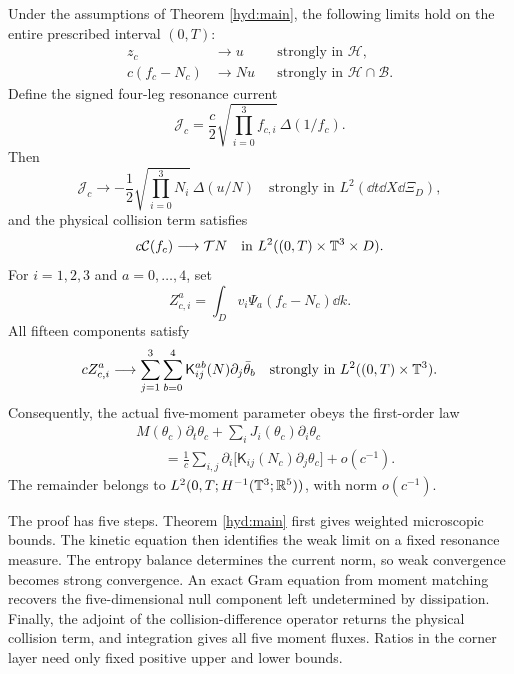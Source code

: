 \begin{theorem}\label{cur:main}
Under the assumptions of Theorem \ref{hyd:main}, the following limits
hold on the entire prescribed interval $(0,T)$:
\begin{align}
 z_c&\longrightarrow u
       &&\text{strongly in }\mathcal H,
       \label{cur:microreciprocal}\\
 c(f_c-N_c)&\longrightarrow Nu
       &&\text{strongly in }\mathcal H\cap\mathcal B.
       \label{cur:microphysical}
\end{align}
Define the signed four-leg resonance current
\[
 \mathcal J_c=\frac c2\sqrt{\prod_{i=0}^3f_{c,i}}\,
                    \Delta(1/f_c).
\]
Then
\begin{equation}\label{cur:resonanceconclusion}
 \mathcal J_c\longrightarrow
 -\frac12\sqrt{\prod_{i=0}^3N_i}\,\Delta(u/N)
 \quad\text{strongly in }L^2(\dd t\dd X\dd\Xi_D),
\end{equation}
and the physical collision term satisfies
\begin{equation}\label{cur:collisionconclusion}
 c\mathcal C(f_c)\longrightarrow\mathcal TN
       \quad\text{in }L^2((0,T)\times\mathbb T^3\times D).
\end{equation}
For $i=1,2,3$ and $a=0,\ldots,4$, set
\[
 Z_{c,i}^a=\int_Dv_i\Psi_a(f_c-N_c)\dd k.
\]
All fifteen components satisfy
\begin{equation}\label{cur:fluxconclusion}
 cZ_{c,i}^a\longrightarrow
       \sum_{j=1}^3\sum_{b=0}^4
          \mathsf K_{ij}^{ab}(N)\partial_j\bar\theta_b
       \quad\text{strongly in }L^2((0,T)\times\mathbb T^3).
\end{equation}
Consequently, the actual five-moment parameter obeys the first-order law
\begin{equation}\label{cur:firstorder}
 \begin{split}
 &M(\theta_c)\partial_t\theta_c
       +\sum_iJ_i(\theta_c)\partial_i\theta_c
 \\
 &\qquad=\frac1c\sum_{i,j}\partial_i
       \bigl[\mathsf K_{ij}(N_c)\partial_j\theta_c\bigr]
       +o(c^{-1}).
 \end{split}
\end{equation}
The remainder belongs to $L^2(0,T;H^{-1}(\mathbb T^3;\mathbb R^5))$, with norm
$o(c^{-1})$.
\end{theorem}

The proof has five steps. Theorem \ref{hyd:main} first gives weighted
microscopic bounds. The kinetic equation then identifies the weak limit
on a fixed resonance measure. The entropy balance determines the current
norm, so weak convergence becomes strong convergence. An exact Gram
equation from moment matching recovers the five-dimensional null
component left undetermined by dissipation. Finally, the adjoint of the
collision-difference operator returns the physical collision term,
and integration gives all five moment fluxes. Ratios in the corner
layer need only fixed positive upper and lower bounds.


